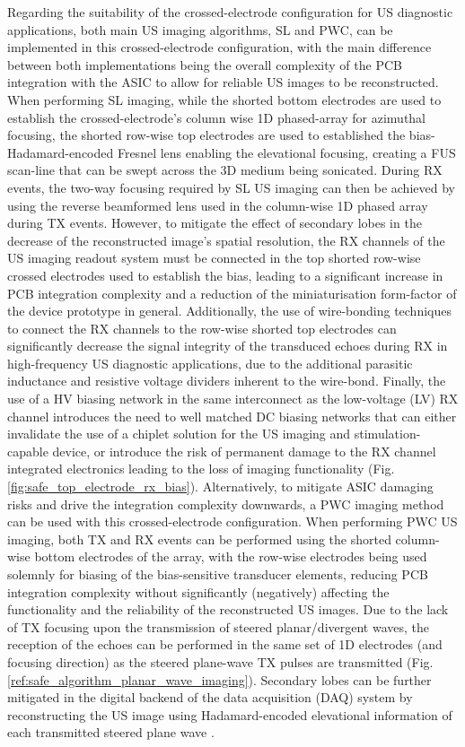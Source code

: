 Regarding the suitability of the crossed-electrode configuration for US diagnostic applications, both main US imaging algorithms, SL and PWC, can be implemented in this crossed-electrode configuration, with the main difference between both implementations being the overall complexity of the PCB integration with the ASIC to allow for reliable US images to be reconstructed. When performing SL imaging, while the shorted bottom electrodes are used to establish the crossed-electrode's column wise 1D phased-array for azimuthal focusing, the shorted row-wise top electrodes are used to established the bias-Hadamard-encoded  Fresnel lens enabling the elevational focusing, creating a FUS scan-line that can be swept across the 3D medium being sonicated. During RX events, the two-way focusing required by SL US imaging can then be achieved by using the reverse beamformed lens used in the column-wise 1D phased array during TX events. However, to mitigate the effect of secondary lobes in the decrease of the reconstructed image's spatial resolution, the RX channels of the US imaging readout system must be connected in the top shorted row-wise crossed electrodes used to establish the bias, leading to a significant increase in PCB integration complexity and a reduction of the miniaturisation form-factor of the device prototype in general. Additionally, the use of wire-bonding techniques to connect the RX channels to the row-wise shorted top electrodes can significantly decrease the signal integrity of the transduced echoes during RX in high-frequency US diagnostic applications, due to the additional parasitic inductance and resistive voltage dividers inherent to the wire-bond. Finally, the use of a HV biasing network in the same interconnect as the low-voltage (LV) RX channel introduces the need to well matched DC biasing networks that can either invalidate the use of a chiplet solution for the US imaging and stimulation-capable device, or introduce the risk of permanent damage to the RX channel integrated electronics leading to the loss of imaging functionality (Fig. \ref{fig:safe_top_electrode_rx_bias}). Alternatively, to mitigate ASIC damaging risks and drive the integration complexity downwards, a PWC imaging method can be used with this crossed-electrode configuration. When performing PWC US imaging, both TX and RX events can be performed using the shorted column-wise bottom electrodes of the array, with the row-wise electrodes being used solemnly for biasing of the bias-sensitive transducer elements, reducing PCB integration complexity without significantly (negatively) affecting the functionality and the reliability of the reconstructed US images. Due to the lack of TX focusing upon the transmission of steered planar/divergent waves, the reception of the echoes can be performed in the same set of 1D electrodes (and focusing direction) as the steered plane-wave TX pulses are transmitted (Fig. \ref{ref:safe_algorithm_planar_wave_imaging}). Secondary lobes can be further mitigated in the digital backend of the data acquisition (DAQ) system by reconstructing the US image using Hadamard-encoded elevational information of each transmitted steered plane wave \cite{https://ieeexplore.ieee.org/document/8926257, https://ieeexplore.ieee.org/document/9957541}.
